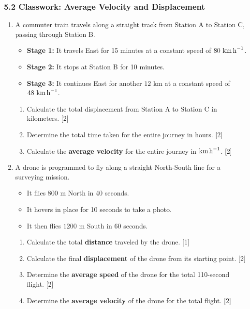 \documentclass[12pt, twoside]{article}
\begin{document}
\subsubsection*{5.2 Classwork: Average Velocity and Displacement}

\begin{enumerate}[itemsep=0.5cm]

\item A commuter train travels along a straight track from Station A to Station C, passing through Station B.
\begin{itemize}[itemsep=0.1cm]
  \item \textbf{Stage 1:} It travels East for 15 minutes at a constant speed of $80 \text{ km\,h}^{-1}$.
  \item \textbf{Stage 2:} It stops at Station B for 10 minutes.
  \item \textbf{Stage 3:} It continues East for another $12 \text{ km}$ at a constant speed of $48 \text{ km\,h}^{-1}$.
\end{itemize}
\begin{enumerate}[itemsep=0.15cm]
  \item Calculate the total displacement from Station A to Station C in kilometers. \hfill [2]
  \item Determine the total time taken for the entire journey in hours. \hfill [2]
  \item Calculate the \textbf{average velocity} for the entire journey in $\text{km\,h}^{-1}$. \hfill [2]
\end{enumerate}

\item A drone is programmed to fly along a straight North-South line for a surveying mission.
\begin{itemize}[itemsep=0.1cm]
  \item It flies $800 \text{ m}$ North in 40 seconds.
  \item It hovers in place for 10 seconds to take a photo.
  \item It then flies $1200 \text{ m}$ South in 60 seconds.
\end{itemize}
\begin{enumerate}[itemsep=0.15cm]
  \item Calculate the total \textbf{distance} traveled by the drone. \hfill [1]
  \item Calculate the final \textbf{displacement} of the drone from its starting point. \hfill [2]
  \item Determine the \textbf{average speed} of the drone for the total 110-second flight. \hfill [2]
  \item Determine the \textbf{average velocity} of the drone for the total flight. \hfill [2]
\end{enumerate}


\end{enumerate}
\end{document}
